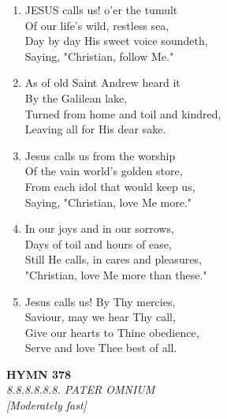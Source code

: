 \begin{enumerate}
    \item JESUS calls us! o'er the tumult \\
        Of our life's wild, restless sea, \\
        Day by day His sweet voice soundeth, \\
        Saying, "Christian, follow Me."

    \item As of old Saint Andrew heard it \\
        By the Galilean lake, \\
        Turned from home and toil and kindred, \\
        Leaving all for His dear sake.

    \item Jesus calls us from the worship \\
        Of the vain world's golden store, \\
        From each idol that would keep us, \\
        Saying, "Christian, love Me more."

    \item In our joys and in our sorrows, \\
        Days of toil and hours of ease, \\
        Still He calls, in cares and pleasures, \\
        "Christian, love Me more than these."

    \item Jesus calls us! By Thy mercies, \\
        Saviour, may we hear Thy call, \\
        Give our hearts to Thine obedience, \\
        Serve and love Thee best of all.

\end{enumerate}

\newpage
\begin{center}
    {\Large \textbf{HYMN 378}}
    \\
    \textit{8.8.8.8.8.8. PATER OMNIUM}
    \\
    \textit{\small [Moderately fast]}
\end{center}
\vspace{1em}

